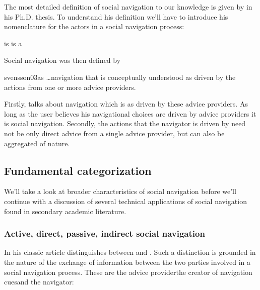 The most detailed definition of social navigation to our knowledge is
given by \citet{svensson03} in his Ph.D. thesis. To understand his
definition we'll have to introduce his nomenclature for the actors in a social
navigation process:

\begin{items}
   is 
   is a 
\end{items}

Social navigation was then defined by
\begin{fullquote}[\p{20}]{svensson03}{as}
  \dots navigation that is conceptually understood as driven by the actions
  from one or more advice providers.
\end{fullquote}

Firstly, \citeauthor{svensson03} talks about navigation which is
 as driven by these advice providers. As long as
the user believes his navigational choices are driven by advice providers it
is social navigation. Secondly, the actions that the navigator is driven by
need not be only direct advice from a single advice provider, but can also be
aggregated of nature.

\subsection{Fundamental categorization}
\label{section:social.navigation.fundamental.categorization}

We'll take a look at broader characteristics of social navigation
before we'll continue with a discussion of several technical applications of
social navigation found in secondary academic literature.

\subsubsection{Active, direct, passive, \oldand indirect social navigation}

In his classic article \citet{dieberger97} distinguishes between
 and .
Such a distinction is grounded in the nature of the exchange of information
between the two parties involved in a social navigation process.
These are the advice provider\dash{}the creator of navigation
cues\dash{}and the navigator:

